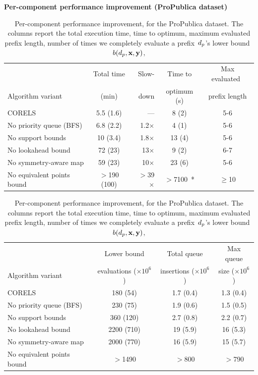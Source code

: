\begin{table}[t!]
\begin{centering}
\textbf{Per-component performance improvement (ProPublica dataset)} \\
\end{centering}
\vspace{1mm}
\begin{tabular}{l | c  r | c | c}
& Total time & Slow- & Time to & Max evaluated~ \\
Algorithm variant & (min) & down & optimum (s) & prefix length \\
\hline
CORELS & 5.5 (1.6) & --- & 8 (2) & 5-6 \\
No priority queue (BFS) & 6.8 (2.2) & 1.2$\times$ & 4 (1) & 5-6 \\
No support bounds & 10 (3.4) & 1.8$\times$ & 13 (4) & 5-6 \\
No lookahead bound & 72 (23) & 13$\times$ & 9 (2) & 6-7 \\
No symmetry-aware map & 59 (23) & 10$\times$ & 23 (6) & 5-6 \\
No equivalent points bound & $>$190 (100) & $>$39$\times$ & $>$7100~* & $\ge$10 \\
\hline
\end{tabular}
\begin{tabular}{l | c | c | c}
\hline
 & Lower bound & Total queue &  Max queue \\
Algorithm variant & evaluations ($\times 10^6$) & insertions ($\times 10^6$) & size ($\times 10^6$) \\
\hline
CORELS & 180 (54) & 1.7 (0.4) & 1.3 (0.4) \\
No priority queue (BFS) & 230 (75) & 1.9 (0.6) & 1.5 (0.5) \\
No support bounds & 360 (120) & 2.7 (0.8) & 2.2 (0.7) \\
No lookahead bound & 2200 (710) & 19 (5.9) & 16 (5.3) \\
No symmetry-aware map & 2000 (770) & 16 (5.9) & 15 (5.7) \\
No equivalent points bound & $>$1490 & $>$800 & $>$790 \\
\end{tabular}
\caption{Per-component performance improvement, for the ProPublica dataset.
%
The columns report the total execution time,
time to optimum, maximum evaluated prefix length,
number of times we completely evaluate a prefix~$d_p$'s lower bound~$b(d_p, \mathbf{x}, \mathbf{y})$,
}
\end{table}
